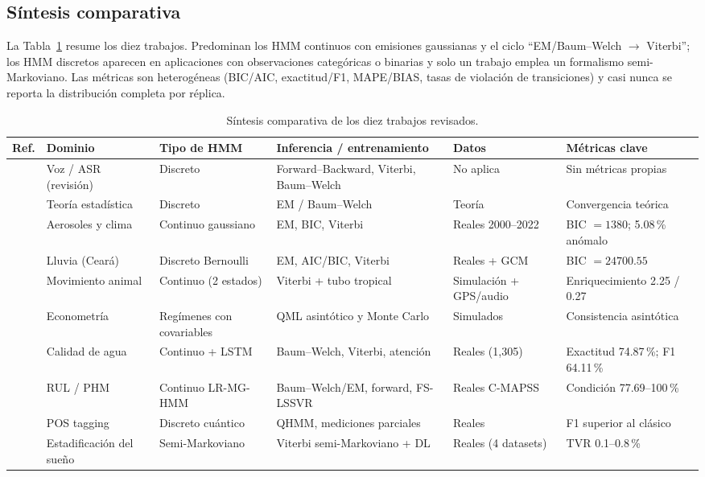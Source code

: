 \documentclass[11pt,letterpaper]{article}
\begin{document}
\subsection{Síntesis comparativa}

La Tabla~\ref{tab:comparativa} resume los diez trabajos. Predominan los HMM continuos con emisiones gaussianas y el ciclo ``EM/Baum--Welch \(\rightarrow\) Viterbi''; los HMM discretos aparecen en aplicaciones con observaciones categóricas o binarias y solo un trabajo emplea un formalismo semi-Markoviano. Las métricas son heterogéneas (BIC/AIC, exactitud/F1, MAPE/BIAS, tasas de violación de transiciones) y casi nunca se reporta la distribución completa por réplica.

\begin{table}[H]
\centering
\caption{Síntesis comparativa de los diez trabajos revisados.}
\label{tab:comparativa}
\footnotesize
\setlength{\tabcolsep}{3pt}
\begin{tabular}{@{}p{0.6cm}p{2.8cm}p{2.7cm}p{3.3cm}p{2.4cm}p{3.0cm}@{}}
\toprule
Ref. & Dominio & Tipo de HMM & Inferencia / entrenamiento & Datos & Métricas clave\\
\midrule
\cite{rabiner1989} & Voz / ASR (revisión) & Discreto & Forward--Backward, Viterbi, Baum--Welch & No aplica & Sin métricas propias\\
\cite{baum1970} & Teoría estadística & Discreto & EM / Baum--Welch & Teoría & Convergencia teórica\\
\cite{wanjala2025} & Aerosoles y clima & Continuo gaussiano & EM, BIC, Viterbi & Reales 2000--2022 & BIC \(=1380\); 5.08\,\% anómalo\\
\cite{grammenos2025} & Lluvia (Ceará) & Discreto Bernoulli & EM, AIC/BIC, Viterbi & Reales + GCM & BIC \(=24700.55\)\\
\cite{nicosia2026} & Movimiento animal & Continuo (2 estados) & Viterbi + tubo tropical & Simulación + GPS/audio & Enriquecimiento 2.25 / 0.27\\
\cite{pouzo2025} & Econometría & Regímenes con covariables & QML asintótico y Monte Carlo & Simulados & Consistencia asintótica\\
\cite{tran2026} & Calidad de agua & Continuo + LSTM & Baum--Welch, Viterbi, atención & Reales (1{,}305) & Exactitud 74.87\,\%; F1 64.11\,\%\\
\cite{li2013} & RUL / PHM & Continuo LR-MG-HMM & Baum--Welch/EM, forward, FS-LSSVR & Reales C-MAPSS & Condición 77.69--100\,\%\\
\cite{deb2026} & POS tagging & Discreto cuántico & QHMM, mediciones parciales & Reales & F1 superior al clásico\\
\cite{wang2026} & Estadificación del sueño & Semi-Markoviano & Viterbi semi-Markoviano + DL & Reales (4 datasets) & TVR 0.1--0.8\,\%\\
\bottomrule
\end{tabular}
\end{table}
\end{document}
